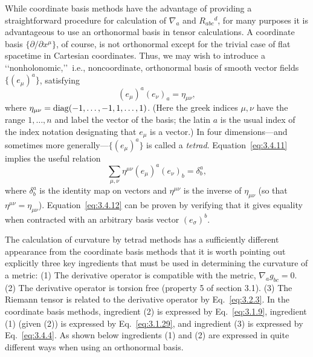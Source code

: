 While coordinate basis methods have the advantage of providing a straightforward
procedure for calculation of $\nabla_a$ and $R_{abc}{}^d$, for many purposes it is advantageous to use
an orthonormal basis in tensor calculations. A coordinate basis $\{\partial/\partial x^\mu\}$, of course,
is not orthonormal except for the trivial case of flat spacetime in Cartesian coordinates. Thus, we may wish to introduce a \lq\lq nonholonomic,\rq\rq\ i.e., noncoordinate,
orthonormal basis of smooth vector fields $\{(e_\mu)^a\}$, satisfying
\begin{equation}
  (e_\mu)^a(e_\nu)_a=\eta_{\mu\nu},
  \tag{3.4.11}\label{eq:3.4.11}
\end{equation}
where $\eta_{\mu\nu}=\operatorname{diag}(-1,\ldots,-1,1,\ldots,1)$. (Here the greek indices $\mu,\nu$ have the
range $1,\ldots,n$ and label the vector of the basis; the latin $a$ is the usual index of
the index notation designating that $e_\mu$ is a vector.) In four dimensions---and sometimes more generally---$\{(e_\mu)^a\}$ is called a \emph{tetrad}. Equation~\eqref{eq:3.4.11} implies the useful
relation
\begin{equation}
  \sum_{\mu,\nu}\eta^{\mu\nu}(e_\mu)^a(e_\nu)_b=\delta^a_b,
  \tag{3.4.12}\label{eq:3.4.12}
\end{equation}
where $\delta^a_b$ is the identity map on vectors and $\eta^{\mu\nu}$ is the inverse of $\eta_{\mu\nu}$ (so that
$\eta^{\mu\nu}=\eta_{\mu\nu}$). Equation~\eqref{eq:3.4.12} can be proven by verifying that it gives equality when
contracted with an arbitrary basis vector $(e_\sigma)^b$.

The calculation of curvature by tetrad methods has a sufficiently different appearance from the coordinate basis methods that it is worth pointing out explicitly three
key ingredients that must be used in determining the curvature of a metric: (1) The
derivative operator is compatible with the metric, $\nabla_ag_{bc}=0$. (2) The derivative
operator is torsion free (property 5 of section 3.1). (3) The Riemann tensor is related
to the derivative operator by Eq.~\eqref{eq:3.2.3}. In the coordinate basis methods,
ingredient (2) is expressed by Eq.~\eqref{eq:3.1.9}, ingredient (1) (given (2)) is expressed
by Eq.~\eqref{eq:3.1.29}, and ingredient (3) is expressed by Eq.~\eqref{eq:3.4.4}. As shown
below ingredients (1) and (2) are expressed in quite different ways when using an
orthonormal basis.

